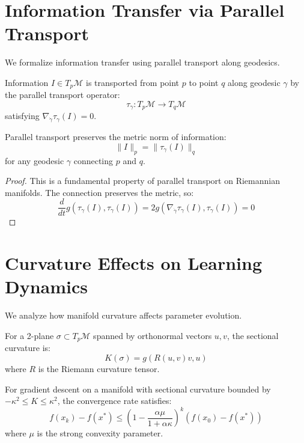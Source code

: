 \section{Information Transfer via Parallel Transport}

We formalize information transfer using parallel transport along geodesics.

\begin{definition}
\label{def:parallel_transport}
Information $I \in T_p\mathcal{M}$ is transported from point $p$ to point $q$ along geodesic $\gamma$ by the parallel transport operator:
$$\tau_{\gamma}: T_p\mathcal{M} \to T_q\mathcal{M}$$
satisfying $\nabla_{\dot{\gamma}} \tau_{\gamma}(I) = 0$.
\end{definition}

\begin{theorem}
\label{thm:information_conservation}
Parallel transport preserves the metric norm of information:
$$\|I\|_p = \|\tau_{\gamma}(I)\|_q$$
for any geodesic $\gamma$ connecting $p$ and $q$.
\end{theorem}

\begin{proof}
This is a fundamental property of parallel transport on Riemannian manifolds. The connection preserves the metric, so:
$$\frac{d}{dt}g(\tau_{\gamma}(I), \tau_{\gamma}(I)) = 2g(\nabla_{\dot{\gamma}}\tau_{\gamma}(I), \tau_{\gamma}(I)) = 0$$
\end{proof}

\section{Curvature Effects on Learning Dynamics}

We analyze how manifold curvature affects parameter evolution.

\begin{definition}
\label{def:sectional_curvature}
For a 2-plane $\sigma \subset T_p\mathcal{M}$ spanned by orthonormal vectors $u, v$, the sectional curvature is:
$$K(\sigma) = g(R(u,v)v, u)$$
where $R$ is the Riemann curvature tensor.
\end{definition}

\begin{theorem}
\label{thm:curvature_convergence}
For gradient descent on a manifold with sectional curvature bounded by $-\kappa^2 \leq K \leq \kappa^2$, the convergence rate satisfies:
$$f(x_k) - f(x^*) \leq \left(1 - \frac{\alpha\mu}{1 + \alpha\kappa}\right)^k (f(x_0) - f(x^*))$$
where $\mu$ is the strong convexity parameter.
\end{theorem}

